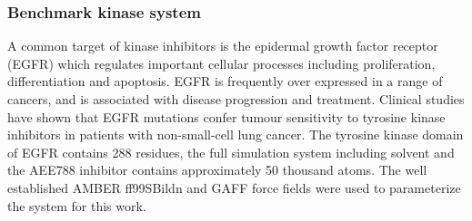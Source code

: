\subsubsection{Benchmark kinase system}

A common target of kinase inhibitors is the epidermal growth factor receptor (EGFR) which regulates important cellular processes including proliferation, differentiation and apoptosis.
EGFR is frequently over expressed in a range of cancers, and is associated with disease progression and treatment. 
Clinical studies have shown that EGFR mutations confer tumour sensitivity to tyrosine kinase inhibitors in patients with non-small-cell lung cancer.
The tyrosine kinase domain of EGFR contains 288 residues, the full simulation system including solvent and the AEE788 inhibitor contains approximately 50 thousand atoms.
The well established AMBER ff99SBildn and GAFF force fields \cite{Maier2015, Wang2004} were used to parameterize the system for this work.